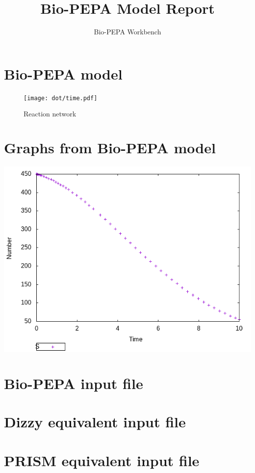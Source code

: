 \documentclass{llncs}
\title{Bio-PEPA Model Report}
\author{Bio-PEPA Workbench}
\institute{\today}
\begin{document}
\maketitle
\section{Bio-PEPA model}

\begin{figure}[htbp]
\begin{center}
\texttt{[image: dot/time.pdf]}
\caption{Reaction network}
\end{center}
\end{figure}
\newpage
\section{Graphs from Bio-PEPA model}
\includegraphics[scale=0.5]{png/time001_sundials_results_0}
\appendix
\newpage
\section{Bio-PEPA input file}

\newpage
\section{Dizzy equivalent input file}

\newpage
\section{PRISM equivalent input file}

\end{document}
